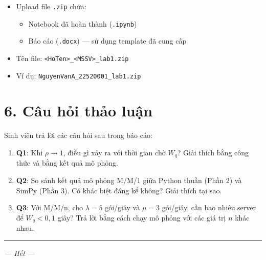 \documentclass[12pt,a4paper]{article}
\begin{document}
\begin{itemize}[nosep]
  \item Upload file \texttt{.zip} chứa:
    \begin{itemize}[nosep]
      \item Notebook đã hoàn thành (\texttt{.ipynb})
      \item Báo cáo (\texttt{.docx}) — sử dụng template đã cung cấp
    \end{itemize}
  \item Tên file: \texttt{<HoTen>\_<MSSV>\_lab1.zip}
  \item Ví dụ: \texttt{NguyenVanA\_22520001\_lab1.zip}
\end{itemize}

\section{6. Câu hỏi thảo luận}

Sinh viên trả lời các câu hỏi sau trong báo cáo:

\begin{enumerate}
  \item \textbf{Q1}: Khi $\rho \to 1$, điều gì xảy ra với thời gian chờ $W_q$? Giải thích bằng công thức và bằng kết quả mô phỏng.

  \item \textbf{Q2}: So sánh kết quả mô phỏng M/M/1 giữa Python thuần (Phần 2) và SimPy (Phần 3). Có khác biệt đáng kể không? Giải thích tại sao.

  \item \textbf{Q3}: Với M/M/n, cho $\lambda = 5$ gói/giây và $\mu = 3$ gói/giây, cần bao nhiêu server để $W_q < 0{,}1$ giây? Trả lời bằng cách chạy mô phỏng với các giá trị $n$ khác nhau.
\end{enumerate}

\vspace{2em}
\hrule
\vspace{0.5em}
\begin{center}
  \textit{— Hết —}
\end{center}
\end{document}
